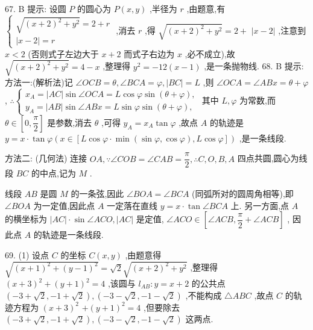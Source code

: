 67. B 提示: 设圆 $P$ 的圆心为 $P\left( {x,y}\right)$ ,半径为 $r$ ,由题意,有 $\left\{  \begin{array}{l} \sqrt{{\left( x + 2\right) }^{2} + {y}^{2}} = 2 + r \\  \left| {x - 2}\right|  = r \end{array}\right.$ ,消去 $r$ ,得 $\sqrt{{\left( x + 2\right) }^{2} + {y}^{2}} = 2 +$  $\left| {x - 2}\right|$ ,注意到 $x < 2$ (否则式子左边大于 $x + 2$ 而式子右边为 $x$ ,必不成立),故 $\sqrt{{\left( x + 2\right) }^{2} + {y}^{2}} = 4 - x$ ,整理得 ${y}^{2} =  - {12}\left( {x - 1}\right)$ ,是一条抛物线. 68. B 提示:方法一:(解析法)记 $\angle {OCB} = \theta ,\angle {BCA} = \varphi ,\left| {BC}\right|  = L$ ,则 $\angle {OCA} = \angle {ABx} = \theta  + \varphi$ , $\therefore \left\{  \begin{array}{l} {x}_{A} = \left| {AC}\right| \sin \angle {OCA} = L\cos \varphi \sin \left( {\theta  + \varphi }\right) , \\  {y}_{A} = \left| {AB}\right| \sin \angle {ABx} = L\sin \varphi \sin \left( {\theta  + \varphi }\right) , \end{array}\right.$ 其中 $L,\varphi$ 为常数,而 $\theta  \in  \left\lbrack  {0,\dfrac{\pi }{2}}\right\rbrack$ 是参数,消去 $\theta$ ,可得 ${y}_{A} = {x}_{A}\tan \varphi$ ,故点 $A$ 的轨迹是 $y = x \cdot  \tan \varphi \left( {x \in  \left\lbrack  {L\cos \varphi  \cdot  \min \left( {\sin \varphi ,\cos \varphi }\right) ,L\cos \varphi }\right\rbrack  }\right)$ ,是一条线段.

方法二: (几何法) 连接 ${OA},\because \angle {COB} = \angle {CAB} = \dfrac{\pi }{2},\therefore C,O,B,A$ 四点共圆,圆心为线段 ${BC}$ 的中点,记为 $M$ .

线段 ${AB}$ 是圆 $M$ 的一条弦,因此 $\angle {BOA} = \angle {BCA}$ (同弧所对的圆周角相等),即 $\angle {BOA}$ 为一定值,因此点 $A$ 一定落在直线 $y = x \cdot  \tan \angle {BCA}$ 上. 另一方面,点 $A$ 的横坐标为 $\left| {AC}\right|  \cdot  \sin \angle {ACO},\left| {AC}\right|$ 是定值, $\angle {ACO} \in  \left\lbrack  {\angle {ACB},\dfrac{\pi }{2} + \angle {ACB}}\right\rbrack$ , 因此点 $A$ 的轨迹是一条线段.

69. (1) 设点 $C$ 的坐标 $C\left( {x,y}\right)$ ,由题意得 $\sqrt{{\left( x + 1\right) }^{2} + {\left( y - 1\right) }^{2}} = \sqrt{2}\sqrt{{\left( x + 2\right) }^{2} + {y}^{2}}$ ,整理得 ${\left( x + 3\right) }^{2} + {\left( y + 1\right) }^{2} = 4$ ,该圆与 ${l}_{AB} : y = x + 2$ 的公共点 $\left( {-3 + \sqrt{2}, - 1 + \sqrt{2}}\right) ,\left( {-3 - \sqrt{2}, - 1 - \sqrt{2}}\right)$ ,不能构成 $\bigtriangleup {ABC}$ ,故点 $C$ 的轨迹方程为 ${\left( x + 3\right) }^{2}$  $+ {\left( y + 1\right) }^{2} = 4$ ,但要除去 $\left( {-3 + \sqrt{2}, - 1 + \sqrt{2}}\right) ,\left( {-3 - \sqrt{2}, - 1 - \sqrt{2}}\right)$ 这两点.

